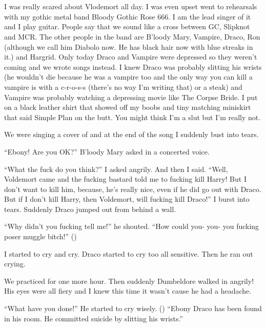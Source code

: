 \section{}



I was really scared about Vlodemort all day. I was even upset went to rehearsals with my gothic metal band Bloody Gothic Rose 666. I am the lead singer of it and I play guitar. People say that we sound like a cross between GC, Slipknot and MCR\@. The other people in the band are B'loody Mary, Vampire, Draco, Ron (although we call him Diabolo now. He has black hair now with blue streaks in it.) and Hargrid. Only today Draco and Vampire were depressed so they weren't coming and we wrote songs instead. I knew Draco was probably slitting his wrists (he wouldn't die because he was a vampire too and the only way you can kill a vampire is with a c-r-o-s-s (there's no way I'm writing that) or a steak) and Vampire was probably watching a depressing movie like The Corpse Bride. I put on a black leather shirt that showed off my boobs and tiny matching miniskirt that said Simple Plan on the butt. You might think I'm a slut but I'm really not.

We were singing a cover of  and at the end of the song I suddenly bust into tears.

\enquote{Ebony! Are you OK\@?} B'loody Mary asked in a concerted voice.

\enquote{What the fuck do you think?} I asked angrily. And then I said. \enquote{Well, Voldemort came and the fucking bastard told me to fucking kill Harry! But I don't want to kill him, because, he's really nice, even if he did go out with Draco. But if I don't kill Harry, then Voldemort, will fucking kill Draco!} I burst into tears.
Suddenly Draco jumped out from behind a wall.

\enquote{Why didn't you fucking tell me!} he shouted. \enquote{How could you- you- you fucking poser muggle bitch!} ()

I started to cry and cry. Draco started to cry too all sensitive. Then he ran out crying.

We practiced for one more hour. Then suddenly Dumbeldore walked in angrily! His eyes were all fiery and I knew this time it wasn't cause he had a headache.

\enquote{What have you done!} He started to cry wisely. () \enquote{Ebony Draco has been found in his room. He committed suicide by slitting his wrists.}
